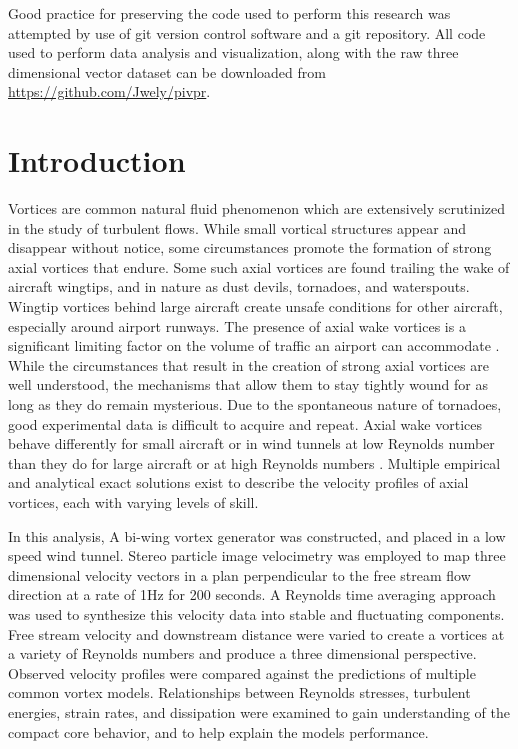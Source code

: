 \documentclass[12pt]{report}
\begin{document}
Good practice for preserving the code used to perform this research was 
attempted by use of git version control software and a git repository. All code 
used to perform data analysis and visualization, along with the raw three 
dimensional vector dataset can be downloaded from 
\url{https://github.com/Jwely/pivpr}.
	

\afterpreface

\chapter{Introduction}
Vortices are common natural fluid phenomenon which are extensively scrutinized 
in the study of turbulent flows. While small vortical structures appear and 
disappear without notice, some circumstances promote the formation of strong 
axial vortices that endure. Some such axial vortices are found trailing the 
wake of aircraft wingtips, and in nature as dust devils, tornadoes, and 
waterspouts. Wingtip vortices behind large aircraft create unsafe conditions 
for other aircraft, especially around airport runways. The presence of axial 
wake vortices is a significant limiting factor on the volume of traffic an 
airport can accommodate \cite{hallock1991}. While the circumstances that result 
in the creation of strong axial vortices are well understood, the mechanisms 
that allow them to stay tightly wound for as long as they do remain mysterious. 
Due to the spontaneous nature of tornadoes, good experimental data is difficult 
to acquire and repeat. Axial wake vortices behave differently for 
small aircraft or in wind tunnels at low Reynolds number than they do for large 
aircraft or at high Reynolds numbers \cite{burnam2013}. Multiple empirical and 
analytical exact solutions exist to describe the velocity profiles of axial 
vortices, each with varying levels of skill.

In this analysis, A bi-wing vortex generator was constructed, and placed in 
a low speed wind tunnel. Stereo particle image velocimetry was employed to 
map three dimensional velocity vectors in a plan perpendicular to the free 
stream flow direction at a rate of 1Hz for 200 seconds. A Reynolds time 
averaging approach was used to synthesize this velocity data into stable 
and fluctuating components. Free stream velocity and downstream distance 
were varied to create a vortices at a variety of Reynolds numbers and produce a 
three dimensional perspective. Observed velocity profiles were compared against 
the predictions of multiple common vortex models. Relationships between 
Reynolds stresses, turbulent energies, strain rates, and dissipation were
examined to gain understanding of the compact core behavior, and to help 
explain the models performance.
\end{document}
